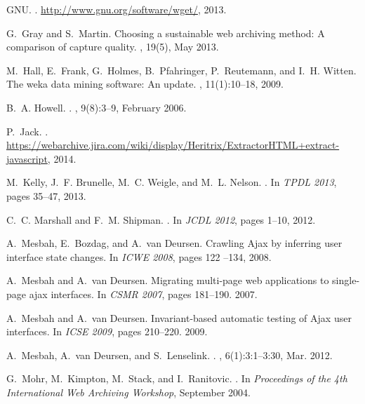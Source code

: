 \documentclass{ipres_proc_article-sp}
\begin{document}
\begin{thebibliography}{10}
{GNU}.
.
\newblock \url{http://www.gnu.org/software/wget/}, 2013.

G.~Gray and S.~Martin.
\newblock Choosing a sustainable web archiving method: A comparison of capture
  quality.
, 19(5), May 2013.

M.~Hall, E.~Frank, G.~Holmes, B.~Pfahringer, P.~Reutemann, and I.~H. Witten.
\newblock The weka data mining software: An update.
, 11(1):10--18, 2009.

B.~A. Howell.
.
, 9(8):3--9, February 2006.

P.~Jack.
.
\newblock
  \url{https://webarchive.jira.com/wiki/display/Heritrix/ExtractorHTML+extract-javascript},
  2014.

M.~Kelly, J.~F. Brunelle, M.~C. Weigle, and M.~L. Nelson.
.
\newblock In {\em {TPDL 2013}}, pages 35--47, 2013.

C.~C. Marshall and F.~M. Shipman.
.
\newblock In {\em {JCDL 2012}}, pages 1--10, 2012.

A.~Mesbah, E.~Bozdag, and A.~van Deursen.
\newblock Crawling {A}jax by inferring user interface state changes.
\newblock In {\em ICWE 2008}, pages 122 --134, 2008.

A.~Mesbah and A.~van Deursen.
\newblock Migrating multi-page web applications to single-page ajax interfaces.
\newblock In {\em CSMR 2007}, pages 181--190. 2007.

A.~Mesbah and A.~van Deursen.
\newblock Invariant-based automatic testing of {A}jax user interfaces.
\newblock In {\em ICSE 2009}, pages 210--220. 2009.

A.~Mesbah, A.~van Deursen, and S.~Lenselink.
.
, 6(1):3:1--3:30, Mar. 2012.

G.~Mohr, M.~Kimpton, M.~Stack, and I.~Ranitovic.
.
\newblock In {\em Proceedings of the 4th International Web Archiving Workshop},
  September 2004.


\end{thebibliography}
\end{document}

